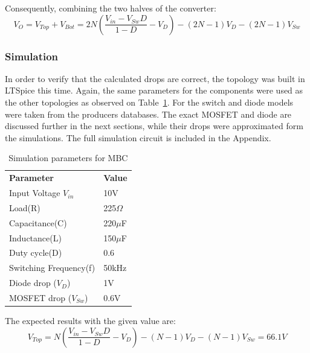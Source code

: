 Consequently, combining the two halves of the converter: 
\begin{equation}
	V_{O}=V_{Top}+V_{Bot}=2N( \frac{V_{in}-V_{Sw}D}{1-D}-V_D)-(2N-1)V_D-(2N-1)V_{Sw}
	\label{eq:DROPS_2INX_FINAL}
\end{equation}

\subsubsection{Simulation}

In order to verify that the calculated drops are correct,
the topology was built in LTSpice this time. 
Again, the same parameters for the components were used as the other topologies as observed on Table~\ref{tab:MBC_2Nx}. 
For the switch and diode models were taken from the producers databases. 
The exact MOSFET and diode are discussed further in the next sections, while their drops were approximated form the simulations.
The full simulation circuit is included in the Appendix. 

\begin{table}[H]
\begin{center}
\caption {Simulation parameters for MBC} \label{tab:MBC_2Nx} 
\begin{tabular}{|l|l|}
\cline{1-2}
\textbf{Parameter} & \textbf{Value}  \\ \cline{1-2}
Input Voltage $V_{in}$          &      10V   \\ \cline{1-2}
Load(R)   & 225$\Omega$           \\ \cline{1-2}
Capacitance(C)          &       220$\mu$F     \\ \cline{1-2}
Inductance(L)          &      150$\mu$F      \\ \cline{1-2}
Duty cycle(D)          &     0.6       \\ \cline{1-2}
Switching Frequency(f)          &      50kHz      \\ \cline{1-2}
Diode drop ($V_D$)          &     1V       \\ \cline{1-2}
MOSFET drop ($V_{Sw}$)          &     0.6V       \\ \cline{1-2}
\end{tabular}
\end{center}
\end{table}

The expected results with the given value are: 
\begin{equation}
	V_{Top}= N( \frac{V_{in}-V_{Sw}D}{1-D}-V_D)-(N-1)V_D-(N-1)V_{Sw}= 66.1V
	\label{eq:DROPS_NX_SIM}
\end{equation}

